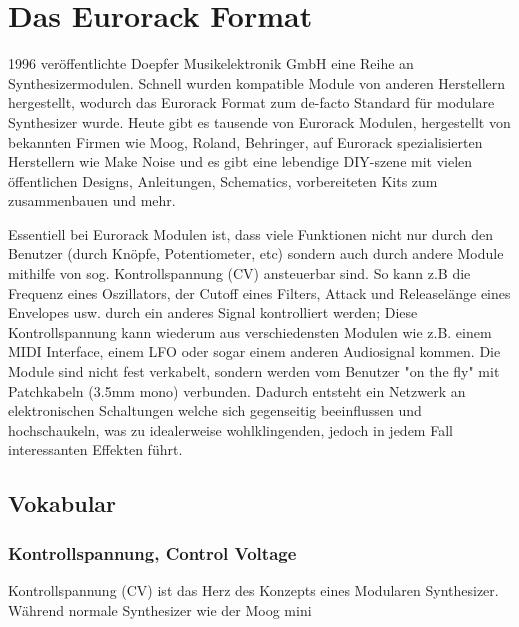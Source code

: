 \section{Das Eurorack Format}
\label{sec:orgc35feee}

1996 veröffentlichte Doepfer Musikelektronik GmbH eine Reihe an Synthesizermodulen. Schnell wurden kompatible Module von anderen Herstellern hergestellt, wodurch das Eurorack Format zum de-facto Standard für modulare Synthesizer wurde. Heute gibt es tausende von Eurorack Modulen, hergestellt von bekannten Firmen wie Moog, Roland, Behringer, auf Eurorack spezialisierten Herstellern wie Make Noise und es gibt eine lebendige DIY-szene mit vielen öffentlichen Designs, Anleitungen, Schematics, vorbereiteten Kits zum zusammenbauen und mehr.

Essentiell bei Eurorack Modulen ist, dass viele Funktionen nicht nur durch den Benutzer (durch Knöpfe, Potentiometer, etc) sondern auch durch andere Module mithilfe von sog. Kontrollspannung (CV) ansteuerbar sind. So kann z.B die Frequenz eines Oszillators, der Cutoff eines Filters, Attack und Releaselänge eines Envelopes usw. durch ein anderes Signal kontrolliert werden; Diese Kontrollspannung kann wiederum aus verschiedensten Modulen wie z.B. einem MIDI Interface, einem LFO oder sogar einem anderen Audiosignal kommen. Die Module sind nicht fest verkabelt, sondern werden vom Benutzer "on the fly" mit Patchkabeln (3.5mm mono) verbunden. Dadurch entsteht ein Netzwerk an elektronischen Schaltungen welche sich gegenseitig beeinflussen und hochschaukeln, was zu idealerweise wohlklingenden, jedoch in jedem Fall interessanten Effekten führt.

\subsection{Vokabular}
\label{sec:orgbb4ceab}
\subsubsection{Kontrollspannung, Control Voltage}
\label{sec:orgfd3fe14}
Kontrollspannung (CV) ist das Herz des Konzepts eines Modularen Synthesizer. Während normale Synthesizer wie der Moog mini 
